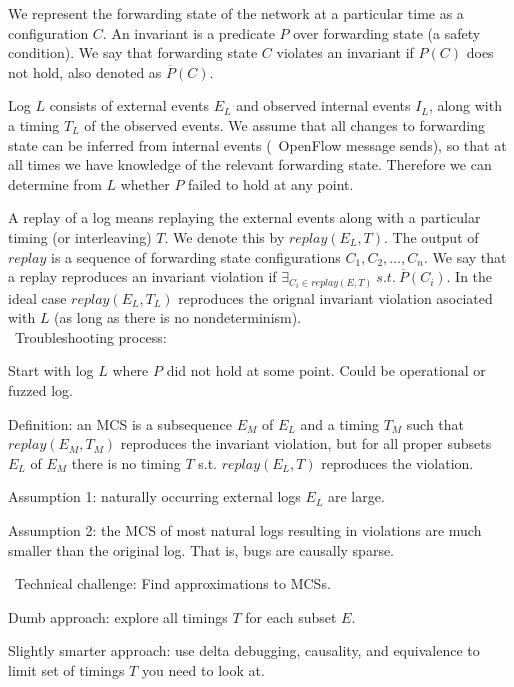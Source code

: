 We represent the forwarding state of the network
at a particular time as a configuration $C$.
An invariant is a predicate $P$ over forwarding state (a safety
condition). We say that forwarding
state $C$ violates an invariant if $P(C)$ does not
hold, also denoted as $\overline{P}(C)$.

Log $L$ consists of external events $E_L$ and observed internal events $I_L$,
along with a timing $T_L$ of the observed events.
We assume that all changes to forwarding state can be inferred
from internal events (\eg~OpenFlow message sends), so
that at all times we have knowledge of the relevant forwarding state.
Therefore we can determine from $L$ whether $P$ failed to hold at any point.

A replay of a log means replaying the external events along with a particular timing (or interleaving) $T$.
We denote this by $replay(E_L,T)$.
The output of $replay$ is a sequence of forwarding state configurations
$C_1,C_2,\dots,C_n$.
We say that a replay reproduces an invariant violation if
$\exists_{C_i \in replay(E,T)}\:s.t.\:\overline{P}(C_i)$.
In the ideal case $replay(E_L,T_L)$ reproduces the orignal invariant violation
asociated with $L$ (as long as there is no nondeterminism). \\

\noindent~Troubleshooting process:

\begin{outline}
\1 Start with log $L$ where $P$ did not hold at some point. Could be operational or fuzzed log.

\1 Definition: an MCS is a subsequence $E_M$ of $E_L$ and a timing $T_M$ such
that $replay(E_M,T_M)$ reproduces the invariant violation, but for all proper
subsets $E_L$ of $E_M$
there is no timing $T$ s.t. $replay(E_L,T)$ reproduces the violation.

\1 Assumption 1: naturally occurring external logs $E_L$ are large.

\1 Assumption 2: the MCS of most natural logs resulting in violations are much smaller than the original log.  That is, bugs are causally sparse.
\end{outline}

\noindent~Technical challenge: Find approximations to MCSs.

\begin{outline}
\1 Dumb approach: explore all timings $T$ for each subset $E$.

\1 Slightly smarter approach: use delta debugging, causality, and equivalence to limit set of timings $T$ you need to look at.
\end{outline}
